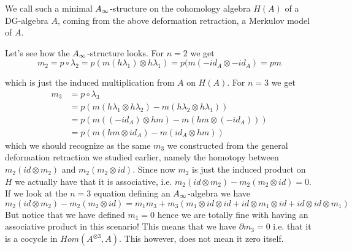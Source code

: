 

We call such a minimal $A_{\infty}$-structure on the cohomology algebra $H(A)$ of a DG-algebra $A$, coming from the above deformation retraction, a Merkulov model of $A$. 

Let's see how the $A_{\infty}$-structure looks. For $n=2$ we get
\begin{equation*}
    m_2 = p\circ \lambda_2 = p(m(h\lambda_1)\otimes h\lambda_1) = p(m(-id_A\otimes -id_A) = pm
\end{equation*}

which is just the induced multiplication from $A$ on $H(A)$. For $n=3$ we get 
\begin{align*}
    m_3 
    &= p\circ \lambda_3 \\
    &= p(m(h\lambda_1\otimes h\lambda_2)-m(h\lambda_2\otimes h\lambda_1)) \\
    &= p(m((-id_A)\otimes hm)-m(hm\otimes (-id_A))) \\
    &= p(m(hm\otimes id_A)-m(id_A\otimes hm))
\end{align*}
which we should recognize as the same $m_3$ we constructed from the general deformation retraction we studied earlier, namely the homotopy between $m_2(id\otimes m_2)$ and $m_2(m_2\otimes id)$. Since now $m_2$ is just the induced product on $H$ we actually have that it is associative, i.e. $m_2(id\otimes m_2)-m_2(m_2\otimes id)=0$. If we look at the $n=3$ equation defining an $A_{\infty}$-algebra we have 
\begin{equation*}
    m_2(id\otimes m_2)-m_2(m_2\otimes id) = m_1 m_3 + m_3(m_1\otimes id\otimes id + id\otimes m_1\otimes id + id\otimes id \otimes m_1)
\end{equation*}
But notice that we have defined $m_1=0$ hence we are totally fine with having an associative product in this scenario! This means that we have $\partial m_3 = 0$ i.e. that it is a cocycle in $Hom(A^{\otimes 3}, A)$. This however, does not mean it zero itself.


